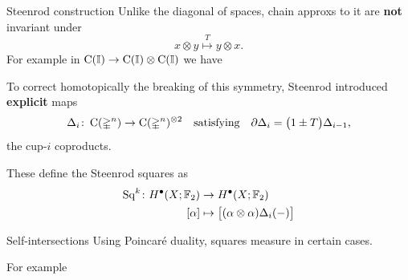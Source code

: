 
\begin{frame}{Steenrod construction}
	\pause
	Unlike the diagonal of spaces, chain approxs to it are \textbf{not} invariant under
	\[
	x \otimes y \stackrel{T}{\mapsto} y \otimes x.
	\]
	For example in $\operatorname{C}(\mathbb{I}) \to \operatorname{C}(\mathbb{I}) \otimes \operatorname{C}(\mathbb{I})$ we have
	\begin{center}
	\end{center}

	\smallskip\pause
	To correct homotopically the breaking of this symmetry, Steenrod introduced \textbf{explicit} maps
	\[
	\Delta_i \colon \operatorname{C}(\mathbb{\Delta}^n) \to \operatorname{C}(\mathbb{\Delta}^n)^{\otimes 2}
	\quad \text{satisfying} \quad
	\partial \Delta_{i} = \big(1 \pm T \big) \Delta_{i-1},
	\]
	the cup-$i$ coproducts.

	\smallskip\pause
	These define the Steenrod squares as
	\[
	\begin{split}
		\operatorname{Sq}^k \colon H^\bullet(X; {\mathbb{F}_2}) &\to H^\bullet(X; {\mathbb{F}_2}) \\
		[\alpha] &\mapsto \big[ (\alpha \otimes \alpha) \Delta_i(-) \big]
	\end{split}
	\]
\end{frame}

\begin{frame}{Self-intersections}
	\pause
	Using Poincar\'e duality, squares measure  in certain cases.

	\pause\bigskip
	For example
	\begin{figure}
		
	\end{figure}
\end{frame}

